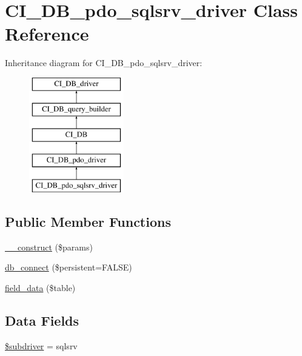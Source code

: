 \hypertarget{class_c_i___d_b__pdo__sqlsrv__driver}{}\section{C\+I\+\_\+\+D\+B\+\_\+pdo\+\_\+sqlsrv\+\_\+driver Class Reference}
\label{class_c_i___d_b__pdo__sqlsrv__driver}
Inheritance diagram for C\+I\+\_\+\+D\+B\+\_\+pdo\+\_\+sqlsrv\+\_\+driver\+:\begin{figure}[H]
\begin{center}
\leavevmode
\includegraphics[height=5.000000cm]{class_c_i___d_b__pdo__sqlsrv__driver}
\end{center}
\end{figure}
\subsection*{Public Member Functions}
\begin{DoxyCompactItemize}
\item 
\hyperlink{class_c_i___d_b__pdo__sqlsrv__driver_a9162320adff1a1a4afd7f2372f753a3e}{\+\_\+\+\_\+construct} (\$params)
\item 
\hyperlink{class_c_i___d_b__pdo__sqlsrv__driver_a52bf595e79e96cc0a7c907a9b45aeb4d}{db\+\_\+connect} (\$persistent=F\+A\+L\+S\+E)
\item 
\hyperlink{class_c_i___d_b__pdo__sqlsrv__driver_a90355121e1ed009e0efdbd544ab56efa}{field\+\_\+data} (\$table)
\end{DoxyCompactItemize}
\subsection*{Data Fields}
\begin{DoxyCompactItemize}
\item 
\hyperlink{class_c_i___d_b__pdo__sqlsrv__driver_a1322ca756348b11d080cb7a4f590de15}{\$subdriver} = \textquotesingle{}sqlsrv\textquotesingle{}
\end{DoxyCompactItemize}
